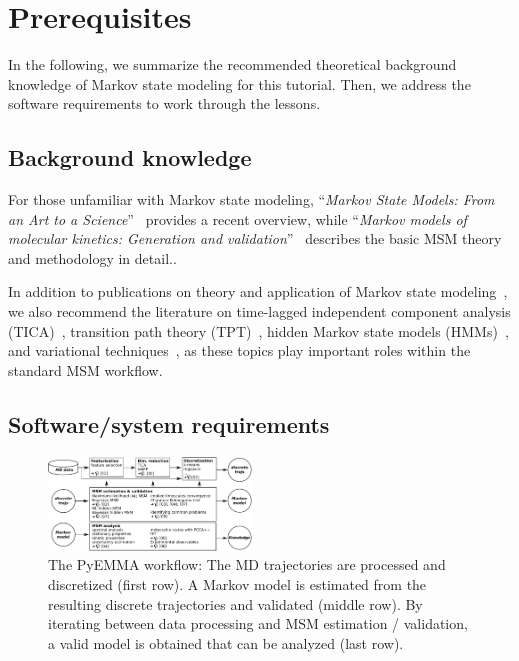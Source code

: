 \documentclass[9pt,tutorial]{livecoms}
\begin{document}
\section{Prerequisites}

In the following, we summarize the recommended theoretical background knowledge of Markov state modeling for this tutorial.
Then, we address the software requirements to work through the lessons.

\subsection{Background knowledge}
\label{sec:background}

For those unfamiliar with Markov state modeling, ``\emph{Markov State Models: From an Art to a Science}''~\cite{msm-brooke} provides a recent overview, while ``\emph{Markov models of molecular kinetics: Generation and validation}''~\cite{msm-jhp} describes the basic MSM theory and methodology in detail.. 

In addition to publications on theory and application of Markov state modeling~\cite{msm-book,buchete-msm-2008,noe-tmat-sampling,bowman-msm-2009,noe-folding-pathways,sarich-msm-quality,noe-fingerprints,noe-dy-neut-scatt,Chodera2014,ben-rev-msm,simon-mech-mod-nmr,oom-feliks},
we also recommend the literature on time-lagged independent component analysis (TICA)~\cite{tica,tica3,tica2,kinetic-maps}, transition path theory (TPT)~\cite{weinan-tpt,metzner-msm-tpt},
hidden Markov state models (HMMs)~\cite{noe-proj-hid-msm,hmm-baum-welch-alg,hmm-tutorial}, and variational techniques~\cite{noe-vac,vamp-preprint,gmrq}, as these topics play important roles within the standard MSM workflow.

\subsection{Software/system requirements}

\begin{figure}
\includegraphics[width=0.48\textwidth]{figure_1}
\caption{The PyEMMA workflow: The MD trajectories are processed and discretized (first row). A Markov model is estimated from the resulting discrete trajectories and validated (middle row). By iterating between data processing and MSM estimation / validation, a valid model is obtained that can be analyzed (last row).}
\label{fig:workflowchart}
\end{figure}
\end{document}
